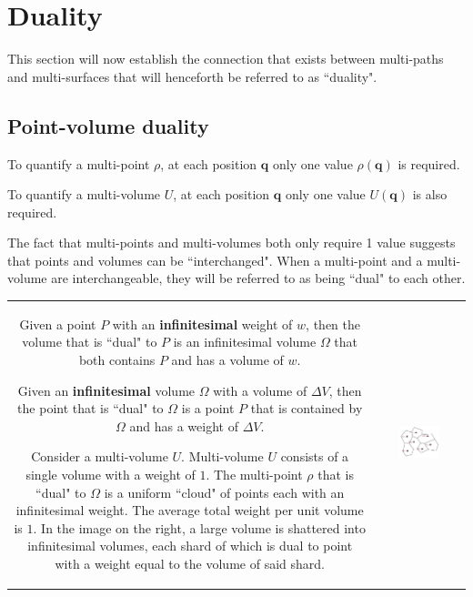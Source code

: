 \documentclass{book}
\begin{document}
\chapter{Duality}

This section will now establish the connection that exists between multi-paths and multi-surfaces that will henceforth be referred to as ``duality".


\section{Point-volume duality}

To quantify a multi-point \(\rho\), at each position \(\mathbf{q}\) only one value \(\rho(\mathbf{q})\) is required. 

To quantify a multi-volume \(U\), at each position \(\mathbf{q}\) only one value \(U(\mathbf{q})\) is also required. 

The fact that multi-points and multi-volumes both only require 1 value suggests that points and volumes can be ``interchanged". When a multi-point and a multi-volume are interchangeable, they will be referred to as being ``dual" to each other.

\begin{tabular}{cc}
\parbox{0.5\textwidth}{
Given a point \(P\) with an {\bf infinitesimal} weight of \(w\), then the volume that is ``dual" to \(P\) is an infinitesimal volume \(\Omega\) that both contains \(P\) and has a volume of \(w\). 

Given an {\bf infinitesimal} volume \(\Omega\) with a volume of \(\Delta V\), then the point that is ``dual" to \(\Omega\) is a point \(P\) that is contained by \(\Omega\) and has a weight of \(\Delta V\).

Consider a multi-volume \(U\). Multi-volume \(U\) consists of a single volume with a weight of \(1\). The multi-point \(\rho\) that is ``dual" to \(\Omega\) is a uniform ``cloud" of points each with an infinitesimal weight. The average total weight per unit volume is \(1\). In the image on the right, a large volume is shattered into infinitesimal volumes, each shard of which is dual to point with a weight equal to the volume of said shard. 
} & \parbox{0.5\textwidth}{
\includegraphics[width = 0.5\textwidth]{Duality/point_volume_duality}
}
\end{tabular}
\end{document}
